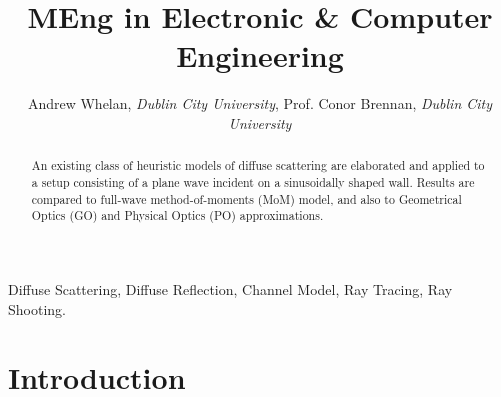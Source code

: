 \documentclass[lettersize,journal]{IEEEtran}
\title{MEng in Electronic \& Computer Engineering}
\author{Andrew Whelan, \emph{Dublin City University},
   Prof. Conor Brennan, \emph{Dublin City University}}
\begin{document}
\maketitle
\begin{abstract}
   An existing class of heuristic models of diffuse scattering are elaborated and
   applied to a setup consisting of a plane wave incident on a sinusoidally shaped
   wall. Results are compared to full-wave method-of-moments (MoM) model, and also to
   Geometrical Optics (GO) and Physical Optics (PO) approximations.
\end{abstract}
\begin{IEEEkeywords}
   Diffuse Scattering, Diffuse Reflection, Channel Model, Ray Tracing, Ray Shooting.
\end{IEEEkeywords}
\section{Introduction}
\end{document}
